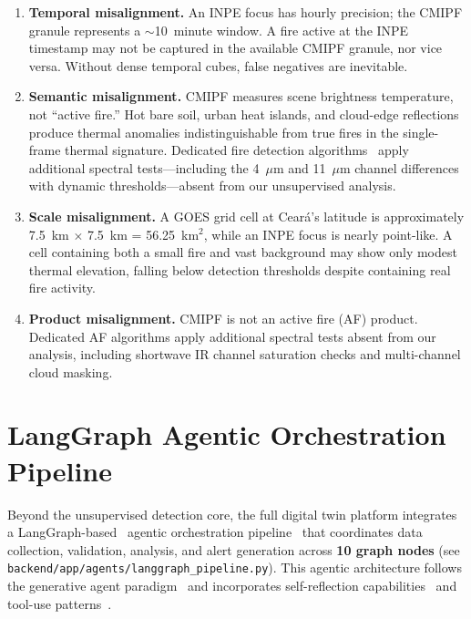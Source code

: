\documentclass[5p,twocolumn]{elsarticle}
\newcommand{\abbrev}[1]{{\small\textsc{#1}}}
\begin{document}
\begin{enumerate}
  \item \textbf{Temporal misalignment.} An \abbrev{INPE} focus has hourly precision; the \abbrev{CMIPF} granule represents a $\sim$10~minute window. A fire active at the \abbrev{INPE} timestamp may not be captured in the available \abbrev{CMIPF} granule, nor vice versa. Without dense temporal cubes, false negatives are inevitable.
  \item \textbf{Semantic misalignment.} \abbrev{CMIPF} measures scene brightness temperature, not ``active fire.'' Hot bare soil, urban heat islands, and cloud-edge reflections produce thermal anomalies indistinguishable from true fires in the single-frame thermal signature. Dedicated fire detection algorithms~\cite{schmidt2021} apply additional spectral tests---including the 4~$\mu$m and 11~$\mu$m channel differences with dynamic thresholds---absent from our unsupervised analysis.
  \item \textbf{Scale misalignment.} A \abbrev{GOES} grid cell at Cear\'{a}'s latitude is approximately 7.5~km $\times$ 7.5~km = 56.25~km$^2$, while an \abbrev{INPE} focus is nearly point-like. A cell containing both a small fire and vast background may show only modest thermal elevation, falling below detection thresholds despite containing real fire activity.
  \item \textbf{Product misalignment.} \abbrev{CMIPF} is not an active fire (\abbrev{AF}) product. Dedicated \abbrev{AF} algorithms apply additional spectral tests absent from our analysis, including shortwave \abbrev{IR} channel saturation checks and multi-channel cloud masking.
\end{enumerate}

\section{LangGraph Agentic Orchestration Pipeline}
\label{sec:langgraph}

Beyond the unsupervised detection core, the full digital twin platform integrates a LangGraph-based~\cite{langchain2025} agentic orchestration pipeline~\cite{xi2023,wang2024_survey,gao2024_rag} that coordinates data collection, validation, analysis, and alert generation across \textbf{10 graph nodes} (see \texttt{backend/app/agents/langgraph\_pipeline.py}). This agentic architecture follows the generative agent paradigm~\cite{park2023} and incorporates self-reflection capabilities~\cite{shinn2023} and tool-use patterns~\cite{schick2023,patil2023}.
\end{document}
